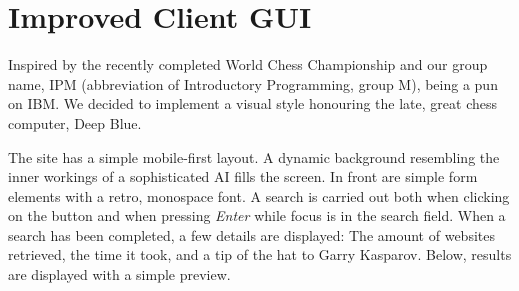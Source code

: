 \section{Improved Client GUI}
Inspired by the recently completed World Chess Championship and our group name, IPM (abbreviation of Introductory Programming, group M), being a pun on IBM. We decided to implement a visual style honouring the late, great chess computer, Deep Blue.

The site has a simple mobile-first layout. A dynamic background resembling the inner workings of a sophisticated AI fills the screen. In front are simple form elements with a retro, monospace font. A search is carried out both when clicking on the button and when pressing \textit{Enter} while focus is in the search field. When a search has been completed, a few details are displayed: The amount of websites retrieved, the time it took, and a tip of the hat to Garry Kasparov. Below, results are displayed with a simple preview. 
